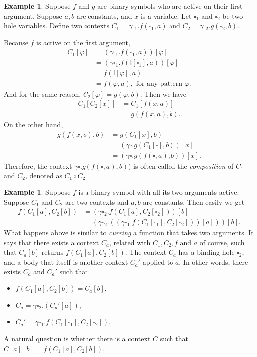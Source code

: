 \documentclass[UTF8]{article}
\newcounter{thmcounter}
\theoremstyle{plain}
\theoremstyle{definition}
\newtheorem{example}[thmcounter]{Example}
\theoremstyle{remark}
\newcommand{\I}{\mathsf{I}}
\begin{document}
\begin{example}
	Suppose $f$ and $g$ are binary symbols who are active on their first argument. Suppose $a, b$ are constants, and $x$ is a variable. Let $\square_1$ and $\square_2$ be two hole variables. Define two contexts $C_1 = \gamma \square_1 . f(\square_1, a)$ and $C_2 = \gamma \square_2 . g(\square_2, b)$. 
	
	Because $f$ is active on the first argument, 
	\begin{align*}
       C_1[\varphi]
       &= (\gamma \square_1 . f(\square_1, a)) [\varphi] \\
       &= (\gamma \square_1 . f(\I[\square_1], a)) [\varphi] \\
       &= f(\I[\varphi], a) \\
       &= f(\varphi, a), \text{ for any pattern $\varphi$.}
	\end{align*}
	And for the same reason, $C_2[\varphi] = g(\varphi, b)$. Then we have
	\begin{align*}
	C_1[C_2[x]]
	&= C_1[f(x,a)] \\
	&= g(f(x,a), b).
	\end{align*}
	On the other hand, 
	\begin{align*}
    g(f(x,a), b)
    &= g(C_1[x], b) \\
    &= (\gamma \square . g(C_1[\square], b))[x] \\
    &= (\gamma \square . g(f(\square, a), b))[x].
	\end{align*}
	Therefore, the context $\gamma \square . g(f(\square, a), b))$ is often called the \emph{composition} of $C_1$ and $C_2$, denoted as $C_1 \circ C_2$.

\end{example}

\begin{example}
	Suppose $f$ is a binary symbol with all its two arguments active. Suppose $C_1$ and $C_2$ are two contexts and $a, b$ are constants. Then easily we get
	\begin{align*}
	f(C_1[a],C_2[b])
	&= (\gamma \square_2 . f(C_1[a], C_2[\square_2]))[b] \\
	&= (\gamma \square_2 . ((\gamma \square_1 . f(C_1[\square_1], C_2[\square_2])) [a] )) [b].
	\end{align*}
	What happens above is similar to \emph{curring} a function that takes two arguments. It says that there exists a context $C_a$, related with $C_1, C_2, f$ and $a$ of course, such that $C_a[b]$ returns $f(C_1[a],C_2[b])$. The context $C_a$ has a binding hole $\square_2$, and a body that itself is another context $C_a'$ applied to $a$. In other words, there exists $C_a$ and $C_a'$ such that 
	\begin{itemize}
	\item $f(C_1[a],C_2[b]) = C_a[b]$,
	\item $C_a = \gamma \square_2 . (C_a'[a])$,
	\item $C_a' = \gamma \square_1 . f(C_1[\square_1], C_2[\square_2])$.
	\end{itemize}
	
	A natural question is whether there is a context $C$ such that $C[a][b] = f(C_1[a],C_2[b])$. 
\end{example}
\end{document}
